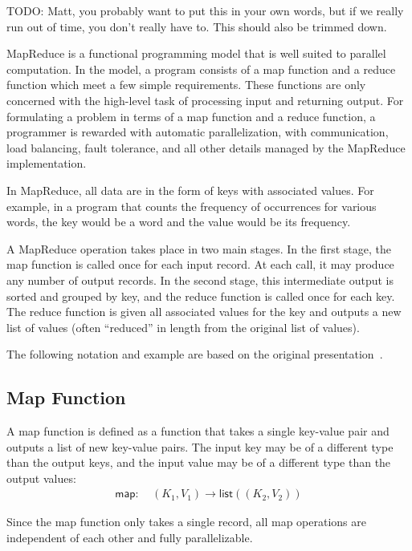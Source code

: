 \documentclass[letterpaper]{sig-alternate}
\providecommand{\List}[1]{\ensuremath{\mathsf{list}(#1)}}
\providecommand{\InputKeySet}{\ensuremath{K_1}}
\providecommand{\OutputKeySet}{\ensuremath{K_2}}
\providecommand{\InputValSet}{\ensuremath{V_1}}
\providecommand{\OutputValSet}{\ensuremath{V_2}}
\begin{document}
TODO: Matt, you probably want to put this in your own words, but if we
really run out of time, you don't really have to.  This should also be trimmed
down.

MapReduce is a functional programming model that is well suited to parallel
computation.  In the model, a program consists of a map function and a reduce
function which meet a few simple requirements.  These functions are only
concerned with the high-level task of processing input and returning output.
For formulating a problem in terms of a map function and a reduce function, a
programmer is rewarded with automatic parallelization, with communication,
load balancing, fault tolerance, and all other details managed by the
MapReduce implementation.

In MapReduce, all data are in the form of keys with associated values.  For
example, in a program that counts the frequency of occurrences for various
words, the key would be a word and the value would be its frequency.

A MapReduce operation takes place in two main stages.  In the first stage, the
map function is called once for each input record.  At each call, it may
produce any number of output records.  In the second stage, this intermediate
output is sorted and grouped by key, and the reduce function is called once
for each key.  The reduce function is given all associated values for the
key and outputs a new list of values (often ``reduced'' in length from the
original list of values).

The following notation and example are based on the original
presentation~\cite{dean-osdi04}.

\subsection{Map Function}

A map function is defined as a function that takes a single key-value pair and
outputs a list of new key-value pairs.  The input key may be of a different
type than the output keys, and the input value may be of a different type than
the output values:
\begin{align}
\mathsf{map}:\:&(\InputKeySet, \InputValSet) \rightarrow
    \List{(\OutputKeySet, \OutputValSet)}
\end{align}

Since the map function only takes a single record, all map operations are
independent of each other and fully parallelizable.
\end{document}
